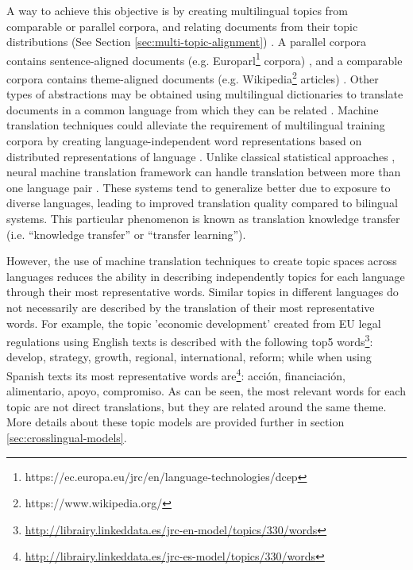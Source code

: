 A way to achieve this objective is by creating multilingual topics from comparable or parallel corpora, and relating documents from their topic distributions (See Section \ref{sec:multi-topic-alignment}) \citep{Graber2009, Boyd-Graber2010, Vulic2015}. A parallel corpora contains sentence-aligned documents (e.g. Europarl\footnote{https://ec.europa.eu/jrc/en/language-technologies/dcep} corpora) \citep{Steinberger2014}, and a comparable corpora contains theme-aligned documents (e.g. Wikipedia\footnote{https://www.wikipedia.org/} articles) \citep{Ni2009, Ni:2011:CLT:1935826.1935887}. Other types of abstractions may be obtained using multilingual dictionaries to translate documents in a common language from which they can be related \citep{errez2016, Liu2015a, Ma2017}. Machine translation techniques could alleviate the requirement of multilingual training corpora by creating language-independent word representations based on distributed representations of language \citep{Dabre2020ASO}. Unlike classical statistical approaches \citep{nakov-ng-2009-improved}, neural machine translation framework can handle translation between more than one language pair \citep{ChenLiu2018, neubig-hu-2018-rapid}. These systems tend to generalize better due to exposure to diverse languages, leading to improved translation quality compared to bilingual systems. This particular phenomenon is known as translation knowledge transfer \citep{Pan2010} (i.e. “knowledge transfer” or “transfer learning”). 

However, the use of machine translation techniques to create topic spaces across languages reduces the ability in describing independently topics for each language through their most representative words. Similar topics in different languages do not necessarily are described by the translation of their most representative words. For example, the topic 'economic development' created from EU legal regulations using English texts is described with the following top5 words\footnote{\url{http://librairy.linkeddata.es/jrc-en-model/topics/330/words}}: develop, strategy, growth, regional, international, reform; while when using Spanish texts its most representative words are\footnote{\url{http://librairy.linkeddata.es/jrc-es-model/topics/330/words}}: acción, financiación, alimentario, apoyo, compromiso. As can be seen, the most relevant words for each topic are not direct translations, but they are related around the same theme. More details about these topic models are provided further in section \ref{sec:crosslingual-models}. 

